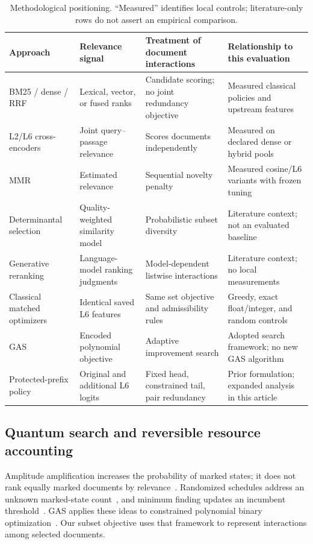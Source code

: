 \begin{table}[t]
\centering\small
\caption{Methodological positioning. ``Measured'' identifies local controls; literature-only rows do not assert an empirical comparison.}
\label{tab:related}
\begin{tabular}{@{}P{.22\textwidth}P{.23\textwidth}P{.24\textwidth}P{.22\textwidth}@{}}
\toprule
Approach & Relevance signal & Treatment of document interactions & Relationship to this evaluation\\
\midrule
BM25 / dense / RRF~\cite{robertson2009bm25,reimers2019sentencebert,cormack2009rrf} & Lexical, vector, or fused ranks & Candidate scoring; no joint redundancy objective & Measured classical policies and upstream features\\
L2/L6 cross-encoders~\cite{nogueira2019bert,crossencoder_models} & Joint query--passage relevance & Scores documents independently & Measured on declared dense or hybrid pools\\
MMR~\cite{carbonell1998mmr} & Estimated relevance & Sequential novelty penalty & Measured cosine/L6 variants with frozen tuning\\
Determinantal selection~\cite{kulesza2012dpp} & Quality-weighted similarity model & Probabilistic subset diversity & Literature context; not an evaluated baseline\\
Generative reranking~\cite{sun2023rankgpt,abdallah2025rerankers} & Language-model ranking judgments & Model-dependent listwise interactions & Literature context; no local measurements\\
Classical matched optimizers & Identical saved L6 features & Same set objective and admissibility rules & Greedy, exact float/integer, and random controls\\
GAS~\cite{gilliam2021gas} & Encoded polynomial objective & Adaptive improvement search & Adopted search framework; no new GAS algorithm\\
Protected-prefix policy~\cite{conference2026} & Original and additional L6 logits & Fixed head, constrained tail, pair redundancy & Prior formulation; expanded analysis in this article\\
\bottomrule
\end{tabular}
\end{table}

\subsection{Quantum search and reversible resource accounting}
Amplitude amplification increases the probability of marked states; it does not rank equally marked documents by relevance~\cite{grover1996search,brassard2002amplitude}. Randomized schedules address an unknown marked-state count~\cite{boyer1998tight}, and minimum finding updates an incumbent threshold~\cite{durr1996minimum}. GAS applies these ideas to constrained polynomial binary optimization~\cite{gilliam2021gas}. Our subset objective uses that framework to represent interactions among selected documents.

